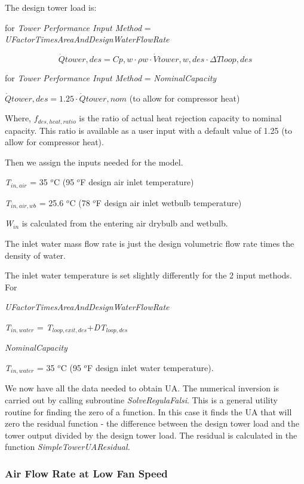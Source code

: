 The design tower load is:

for \emph{Tower Performance Input Method} = \emph{UFactorTimesAreaAndDesignWaterFlowRate}

\begin{equation}
\dot Qtower,des = Cp,w\cdot \rho w\cdot \dot Vtower,w,des\cdot \Delta Tloop,des
\end{equation}

for \emph{Tower Performance Input Method} = \emph{NominalCapacity}

\(\dot Qtower,des = 1.25\cdot \dot Qtower,nom\) (to allow for compressor heat)

Where, \({f_{des,heat,ratio}}\) is the ratio of actual heat rejection capacity to nominal capacity. This ratio is available as a user input with a default value of 1.25 (to allow for compressor heat).

Then we assign the inputs needed for the model.

\emph{T\(_{in,air}\)} = 35 \(^{o}\)C (95 \(^{o}\)F design air inlet temperature)

\emph{T\(_{in,air,wb}\)} = 25.6 \(^{o}\)C (78 \(^{o}\)F design air inlet wetbulb temperature)

\emph{W\(_{in}\)} is calculated from the entering air drybulb and wetbulb.

The inlet water mass flow rate is just the design volumetric flow rate times the density of water.

The inlet water temperature is set slightly differently for the 2 input methods. For

\emph{UFactorTimesAreaAndDesignWaterFlowRate}

\emph{T\(_{in,water}\)} = \emph{T\(_{loop,exit,des}\)}+\emph{DT\(_{loop,des}\)}

\emph{NominalCapacity}

\emph{T\(_{in,water}\)} = 35 \(^{o}\)C (95 \(^{o}\)F design inlet water temperature).

We now have all the data needed to obtain UA. The numerical inversion is carried out by calling subroutine \emph{SolveRegulaFalsi}. This is a general utility routine for finding the zero of a function. In this case it finds the UA that will zero the residual function - the difference between the design tower load and the tower output divided by the design tower load. The residual is calculated in the function \emph{SimpleTowerUAResidual.}

\subsubsection{Air Flow Rate at Low Fan Speed}\label{air-flow-rate-at-low-fan-speed}

